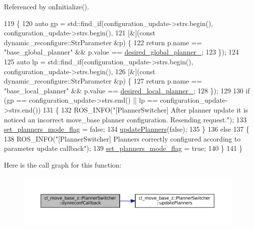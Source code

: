 Referenced by on\+Initialize().


\begin{DoxyCode}
119 \{
120   \textcolor{keyword}{auto} gp = std::find\_if(configuration\_update->strs.begin(), configuration\_update->strs.begin(),
121                          [&](\textcolor{keyword}{const} dynamic\_reconfigure::StrParameter &p) \{
122                            \textcolor{keywordflow}{return} p.name == \textcolor{stringliteral}{"base\_global\_planner"} && p.value == 
      \hyperlink{classcl__move__base__z_1_1PlannerSwitcher_aef047d3778b2993c1df146bbad43e03d}{desired\_global\_planner\_};
123                          \});
124 
125   \textcolor{keyword}{auto} lp = std::find\_if(configuration\_update->strs.begin(), configuration\_update->strs.begin(),
126                          [&](\textcolor{keyword}{const} dynamic\_reconfigure::StrParameter &p) \{
127                            \textcolor{keywordflow}{return} p.name == \textcolor{stringliteral}{"base\_local\_planner"} && p.value == 
      \hyperlink{classcl__move__base__z_1_1PlannerSwitcher_a6cbf65f11bb69125f913caaabdf7b4cf}{desired\_local\_planner\_};
128                          \});
129 
130   \textcolor{keywordflow}{if} (gp == configuration\_update->strs.end() || lp == configuration\_update->strs.end())
131   \{
132     ROS\_INFO(\textcolor{stringliteral}{"[PlannerSwitcher] After planner update it is noticed an incorrect move\_base planner
       configuration. Resending request."});
133     \hyperlink{classcl__move__base__z_1_1PlannerSwitcher_a6c14fd001513787ed213704e2d3dc383}{set\_planners\_mode\_flag} = \textcolor{keyword}{false};
134     \hyperlink{classcl__move__base__z_1_1PlannerSwitcher_a146641f63aea3185daab4c5cbb789550}{updatePlanners}(\textcolor{keyword}{false});
135   \}
136   \textcolor{keywordflow}{else}
137   \{
138     ROS\_INFO(\textcolor{stringliteral}{"[PlannerSwitcher] Planners correctly configured according to parameter update callback"});
139     \hyperlink{classcl__move__base__z_1_1PlannerSwitcher_a6c14fd001513787ed213704e2d3dc383}{set\_planners\_mode\_flag} = \textcolor{keyword}{true};
140   \}
141 \}
\end{DoxyCode}
Here is the call graph for this function\+:
\nopagebreak
\begin{figure}[H]
\begin{center}
\leavevmode
\includegraphics[width=350pt]{classcl__move__base__z_1_1PlannerSwitcher_ad9371bd8d62600ef874e8914c3ec177b_cgraph}
\end{center}
\end{figure}
